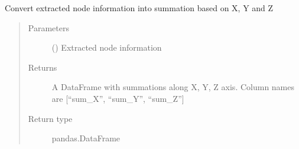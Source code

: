 \documentclass[letterpaper,10pt,english]{sphinxmanual}
\begin{document}
\begin{fulllineitems}
\begin{fulllineitems}
\begin{quote}
\begin{description}
\end{description}\end{quote}

\end{fulllineitems}


\begin{fulllineitems}
\label{\detokenize{openfdem:openfdem.openfdem.Model.convert_to_xyz_array}}
Convert extracted node information into summation based on X, Y and Z
\begin{quote}\begin{description}
\item[{Parameters}] \leavevmode
{} () \textendash{} Extracted node information

\item[{Returns}] \leavevmode
A DataFrame with summations along X, Y, Z axis. Column names are {[}“sum\_X”, “sum\_Y”, “sum\_Z”{]}

\item[{Return type}] \leavevmode
pandas.DataFrame


\end{description}
\end{quote}
\end{fulllineitems}
\end{fulllineitems}
\end{document}
